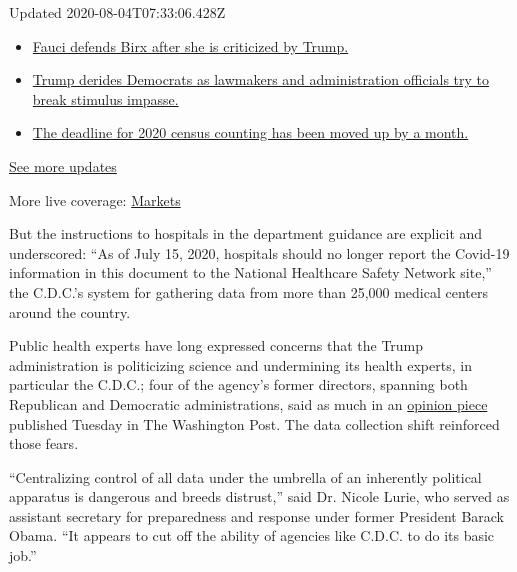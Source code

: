 Updated 2020-08-04T07:33:06.428Z

\begin{itemize}
\tightlist
\item
  \href{https://www.nytimes.com/2020/08/03/world/coronavirus-covid-19.html?action=click\&pgtype=Article\&state=default\&region=MAIN_CONTENT_1\&context=storylines_live_updates\#link-4547638f}{Fauci
  defends Birx after she is criticized by Trump.}
\item
  \href{https://www.nytimes.com/2020/08/03/world/coronavirus-covid-19.html?action=click\&pgtype=Article\&state=default\&region=MAIN_CONTENT_1\&context=storylines_live_updates\#link-15e7f995}{Trump
  derides Democrats as lawmakers and administration officials try to
  break stimulus impasse.}
\item
  \href{https://www.nytimes.com/2020/08/03/world/coronavirus-covid-19.html?action=click\&pgtype=Article\&state=default\&region=MAIN_CONTENT_1\&context=storylines_live_updates\#link-e5a2cda}{The
  deadline for 2020 census counting has been moved up by a month.}
\end{itemize}

\href{https://www.nytimes.com/2020/08/03/world/coronavirus-covid-19.html?action=click\&pgtype=Article\&state=default\&region=MAIN_CONTENT_1\&context=storylines_live_updates}{See
more updates}

More live coverage:
\href{https://www.nytimes.com/live/2020/08/03/business/stock-market-today-coronavirus?action=click\&pgtype=Article\&state=default\&region=MAIN_CONTENT_1\&context=storylines_live_updates}{Markets}

But the instructions to hospitals in the department guidance are
explicit and underscored: ``As of July 15, 2020, hospitals should no
longer report the Covid-19 information in this document to the National
Healthcare Safety Network site,'' the C.D.C.'s system for gathering data
from more than 25,000 medical centers around the country.

Public health experts have long expressed concerns that the Trump
administration is politicizing science and undermining its health
experts, in particular the C.D.C.; four of the agency's former
directors, spanning both Republican and Democratic administrations, said
as much in an
\href{https://www.washingtonpost.com/outlook/2020/07/14/cdc-directors-trump-politics/}{opinion
piece} published Tuesday in The Washington Post. The data collection
shift reinforced those fears.

``Centralizing control of all data under the umbrella of an inherently
political apparatus is dangerous and breeds distrust,'' said Dr. Nicole
Lurie, who served as assistant secretary for preparedness and response
under former President Barack Obama. ``It appears to cut off the ability
of agencies like C.D.C. to do its basic job.''

